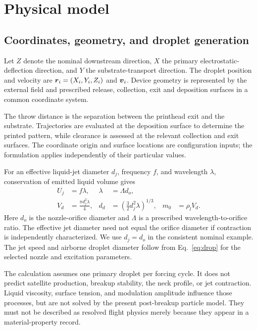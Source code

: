 \section{Physical model}
\subsection{Coordinates, geometry, and droplet generation}
Let $Z$ denote the nominal downstream direction, $X$ the primary electrostatic-deflection direction, and $Y$ the substrate-transport direction. The droplet position and velocity are $\boldsymbol{r}_i=(X_i,Y_i,Z_i)$ and $\boldsymbol{v}_i$. Device geometry is represented by the external field and prescribed release, collection, exit and deposition surfaces in a common coordinate system.

The throw distance is the separation between the printhead exit and the substrate. Trajectories are evaluated at the deposition surface to determine the printed pattern, while clearance is assessed at the relevant collection and exit surfaces. The coordinate origin and surface locations are configuration inputs; the formulation applies independently of their particular values.

For an effective liquid-jet diameter $d_j$, frequency $f$, and wavelength $\lambda$, conservation of emitted liquid volume gives
\begin{align}
 U_j&=f\lambda, & \lambda&=\Lambda d_o,\\
 V_d&=\frac{\pi d_j^2\lambda}{4}, &
 d_d&=\left(\frac{3}{2}d_j^2\lambda\right)^{1/3}, &
 m_0&=\rho_l V_d.
\label{eq:drop}
\end{align}
Here $d_o$ is the nozzle-orifice diameter and $\Lambda$ is a prescribed wavelength-to-orifice ratio. The effective jet diameter need not equal the orifice diameter if contraction is independently characterized. We use $d_j=d_o$ in the consistent nominal example. The jet speed and airborne droplet diameter follow from Eq.~\eqref{eq:drop} for the selected nozzle and excitation parameters.

The calculation assumes one primary droplet per forcing cycle. It does not predict satellite production, breakup stability, the neck profile, or jet contraction. Liquid viscosity, surface tension, and modulation amplitude influence those processes, but are not solved by the present post-breakup particle model. They must not be described as resolved flight physics merely because they appear in a material-property record.

